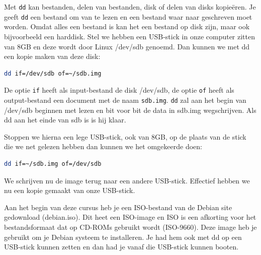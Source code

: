 Met \texttt{dd} kan bestanden, delen van bestanden, disk of delen van disks kopie\"eren. Je geeft \texttt{dd} een bestand om van te lezen en een bestand waar naar geschreven moet worden. Omdat alles een bestand is kan het een bestand op disk zijn, maar ook bijvoorbeeld een harddisk. Stel we hebben een USB-stick in onze computer zitten van 8GB en deze wordt door Linux /dev/sdb genoemd. Dan kunnen we met dd een kopie maken van deze disk:
\begin{lstlisting}[language=bash]
dd if=/dev/sdb of=~/sdb.img
\end{lstlisting}
De optie \texttt{if} heeft als input-bestand de disk /dev/sdb, de optie \texttt{of} heeft als output-bestand een document met de naam \texttt{sdb.img}. \texttt{dd} zal aan het begin van /dev/sdb beginnen met lezen en bit voor bit de data in sdb.img wegschrijven. Als dd aan het einde van sdb is is hij klaar.

Stoppen we hierna een lege USB-stick, ook van 8GB, op de plaats van de stick die we net gelezen hebben dan kunnen we het omgekeerde doen:
\begin{lstlisting}[language=bash]
dd if=~/sdb.img of=/dev/sdb
\end{lstlisting}
We schrijven nu de image terug naar een andere USB-stick. Effectief hebben we nu een kopie gemaakt van onze USB-stick.

Aan het begin van deze cursus heb je een ISO-bestand van de Debian site gedownload (debian.iso). Dit heet een ISO-image en ISO is een afkorting voor het bestandsformaat dat op CD-ROMs gebruikt wordt (ISO-9660). Deze image heb je gebruikt om je Debian systeem te installeren. Je had hem ook met dd op een USB-stick kunnen zetten en dan had je vanaf die USB-stick kunnen booten.


